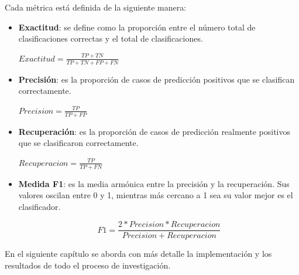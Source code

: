 Cada métrica está definida de la siguiente manera:  
\begin{itemize}
    \item \textbf{Exactitud}: se define como la proporción entre el número total de clasificaciones correctas y el total de clasificaciones.
    \begin{center}
        $Exactitud = \frac{TP + TN}{TP + TN + FP+ FN} $
    \end{center}
    \item \textbf{Precisión}: es la proporción de casos de predicción positivos que se clasifican correctamente. 
    \begin{center}
        $Precision = \frac{TP}{TP + FP}$
    \end{center}
    \item \textbf{Recuperación}: es la proporción de casos de predicción realmente positivos que se clasificaron correctamente. 
    \begin{center}
        $Recuperacion = \frac{TP}{TP+FN}$
    \end{center}
    \item \textbf{Medida F1}: es la media armónica entre la precisión y la recuperación. Sus valores oscilan entre 0 y 1, mientras más cercano a 1 sea su valor mejor es el clasificador. 
    \begin{center}
        $$F1 = \frac{2 * Precision * Recuperacion}{Precision + Recuperacion}$$
    \end{center}

\end{itemize}

En el siguiente capítulo se aborda con más detalle la implementación y los resultados de todo el proceso de investigación.  


